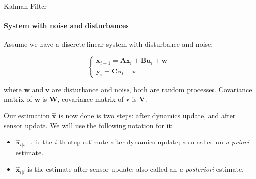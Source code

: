 \documentclass{beamer}
\begin{document}
\begin{frame}{Kalman Filter}
\framesubtitle{System with noise and disturbances}
\begin{flushleft}

Assume we have a discrete linear system with disturbance and noise:

\[
\begin{cases}
\mathbf x_{i+1} = \mathbf A \mathbf x_i + 
\mathbf B \mathbf u_i + \mathbf w\\
\mathbf y_i = \mathbf C \mathbf x_i  + \mathbf v
\end{cases}
\]

where $\mathbf w$ and $\mathbf v$ are disturbance and noise, both are random processes. Covariance matrix of $\mathbf w$ is $\mathbf W$, covariance matrix of $\mathbf v$ is $\mathbf V$.

\bigskip

Our estimation $\hat{\mathbf x}$ is now done is two steps: after dynamics update, and after sensor update. We will use the following notation for it:

\begin{itemize}
    \item $\hat{\mathbf x}_{i|i-1}$ is the $i$-th step estimate after dynamics update; also called an \emph{a priori} estimate.
    \item $\hat{\mathbf x}_{i|i}$ is the estimate after sensor update; also called an \emph{a posteriori} estimate.
\end{itemize}

\end{flushleft}
\end{frame}
\end{document}
